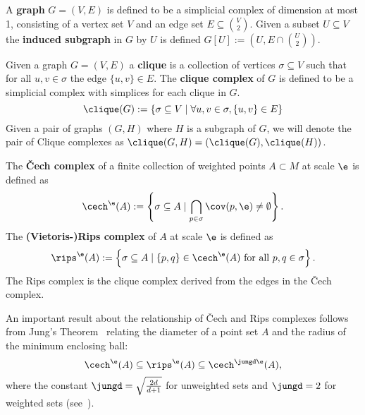    A \textbf{graph} $G = (V,E)$ is defined to be a simplicial complex of dimension at most 1, consisting of a vertex set $V$ and an edge set $E\subseteq{V\choose 2}$.
    Given a subset $U\subseteq V$ the \textbf{induced subgraph} in $G$ by $U$ is defined $G[U] := (U, E\cap{U\choose 2})$.

    Given a graph $G = (V, E)$ a \textbf{clique} is a collection of vertices $\sigma\subseteq V$ such that for all $u,v\in\sigma$ the edge $\{u,v\}\in E$.
    The \textbf{clique complex} of $G$ is defined to be a simplicial complex with simplices for each clique in $G$.
    \[
      \clique(G) := \{ \sigma\subseteq V\mid \forall u,v\in\sigma, \{u,v\}\in E \}
    \]
    Given a pair of graphs $(G, H)$ where $H$ is a subgraph of $G$, we will denote the pair of Clique complexes as $\clique(G,H) = (\clique(G),\clique(H))$.

    The \textbf{\v Cech complex} of a finite collection of weighted points $A\subset M$ at scale $\e$ is defined as
    \[
      \cech^\e(A) := \left\{\sigma \subseteq A\mid \bigcap_{p\in \sigma}\cov(p,\e)\neq \emptyset \right\}.
    \]
    The \textbf{(Vietoris-)Rips complex} of $A$ at scale $\e$ is defined as
    \[
      \rips^\e(A) := \left\{\sigma \subseteq A \mid \{p,q\}\in\cech^\e(A) \text{ for all $p,q\in \sigma$}\right\}.
    \]
    The Rips complex is the clique complex derived from the edges in the \v Cech complex.

    An important result about the relationship of \v Cech and Rips complexes follows from Jung's Theorem~\cite{jung01uber} relating the diameter of a point set $A$ and the radius of the minimum enclosing ball:
    \begin{equation}\label{eq:jung_inclusion}
      \cech^\e(A) \subseteq \rips^\e(A) \subseteq \cech^{\jungd \e}(A),
    \end{equation}
    where the constant $\jungd = \sqrt{\frac{2d}{d+1}}$ for unweighted sets and $\jungd = 2$ for weighted sets (see~\cite{buchet15efficient}).


